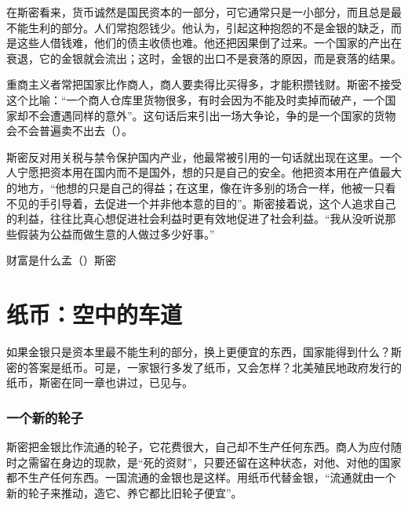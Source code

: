 在斯密看来，货币诚然是国民资本的一部分，可它通常只是一小部分，而且总是最不能生利的部分\cite{smith1776}。人们常抱怨钱少。他认为，引起这种抱怨的不是金银的缺乏，而是这些人借钱难，他们的债主收债也难\cite{smith1776}。他还把因果倒了过来。一个国家的产出在衰退，它的金银就会流出；这时，金银的出口不是衰落的原因，而是衰落的结果\cite{smith1776}。

重商主义者常把国家比作商人，商人要卖得比买得多，才能积攒钱财。斯密不接受这个比喻：“一个商人仓库里货物很多，有时会因为不能及时卖掉而破产，一个国家却不会遭遇同样的意外”\cite{smith1776}。这句话后来引出一场大争论，争的是一个国家的货物会不会普遍卖不出去（）。

斯密反对用关税与禁令保护国内产业，他最常被引用的一句话就出现在这里。一个人宁愿把资本用在国内而不是国外，想的只是自己的安全。他把资本用在产值最大的地方，“他想的只是自己的得益；在这里，像在许多别的场合一样，他被一只看不见的手引导着，去促进一个并非他本意的目的”\cite{smith1776}。斯密接着说，这个人追求自己的利益，往往比真心想促进社会利益时更有效地促进了社会利益。“我从没听说那些假装为公益而做生意的人做过多少好事。”\cite{smith1776}

\begin{compare}{财富是什么}{孟（）}{斯密}
\end{compare}

\section{纸币：空中的车道}\label{sec:smith-paper}

如果金银只是资本里最不能生利的部分，换上更便宜的东西，国家能得到什么？斯密的答案是纸币。可是，一家银行多发了纸币，又会怎样？北美殖民地政府发行的纸币，斯密在同一章也讲过，已见与。

\subsubsection{一个新的轮子}
斯密把金银比作流通的轮子，它花费很大，自己却不生产任何东西。商人为应付随时之需留在身边的现款，是“死的资财”，只要还留在这种状态，对他、对他的国家都不生产任何东西。一国流通的金银也是这样\cite{smith1776}。用纸币代替金银，“流通就由一个新的轮子来推动，造它、养它都比旧轮子便宜”\cite{smith1776}。

